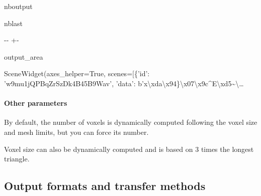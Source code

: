 \documentclass[letterpaper,10pt,english]{sphinxmanual}
\begin{document}
\begin{sphinxuseclass}{nboutput}
\begin{sphinxuseclass}{nblast}
{

\kern-\sphinxverbatimsmallskipamount\kern-\baselineskip
\kern+\FrameHeightAdjust\kern-\fboxrule
\vspace{\nbsphinxcodecellspacing}

\begin{sphinxuseclass}{output_area}
\begin{sphinxuseclass}{}


\begin{sphinxVerbatim}[commandchars=\\\{\}]
\llap{\color{nbsphinxout}[21]:\,\hspace{\fboxrule}\hspace{\fboxsep}}SceneWidget(axes\_helper=True, scenes=[\{'id': 'w9mu1jQPBqZrSzDk4B45B9Wav', 'data': b'x\textbackslash{}xda\textbackslash{}x94\}\textbackslash{}x07\textbackslash{}x9c\^{}E\textbackslash{}xd5\textasciitilde{}\textbackslash{}…
\end{sphinxVerbatim}



\end{sphinxuseclass}
\end{sphinxuseclass}
}

\end{sphinxuseclass}
\end{sphinxuseclass}

\paragraph{Other parameters}
\label{\detokenize{lightmodels_functionnalities:id1}}
\sphinxAtStartPar
By default, the number of voxels is dynamically computed following the voxel size and mesh limits, but you can force its number.

\sphinxAtStartPar
Voxel size can also be dynamically computed and is based on 3 times the longest triangle.

\sphinxstepscope


\subsection{Output formats and transfer methods}
\label{\detokenize{outputs_and_plantmodels_transfer:Output-formats-and-transfer-methods}}\label{\detokenize{outputs_and_plantmodels_transfer::doc}}
\end{document}
